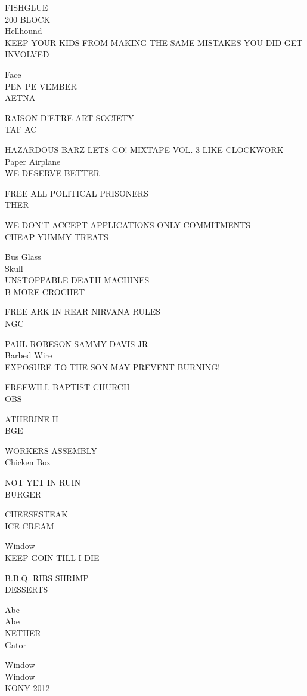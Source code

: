 \documentclass[10pt,letterpaper]{article}
\begin{document}
FISHGLUE\\
200 BLOCK\\
Hellhound\\
KEEP YOUR KIDS FROM MAKING THE SAME MISTAKES YOU DID GET INVOLVED

Face\\
PEN PE VEMBER\\
AETNA

RAISON D'ETRE ART SOCIETY\\
TAF AC

HAZARDOUS BARZ LETS GO! MIXTAPE VOL. 3 LIKE CLOCKWORK\\
Paper Airplane\\
WE DESERVE BETTER

FREE ALL POLITICAL PRISONERS\\
THER

WE DON'T ACCEPT APPLICATIONS ONLY COMMITMENTS\\
CHEAP YUMMY TREATS

Bus Glass\\
Skull\\
UNSTOPPABLE DEATH MACHINES\\
B{-}MORE CROCHET

FREE ARK IN REAR NIRVANA RULES\\
NGC

PAUL ROBESON SAMMY DAVIS JR\\
Barbed Wire\\
EXPOSURE TO THE SON MAY PREVENT BURNING!

FREEWILL BAPTIST CHURCH\\
OBS

ATHERINE H\\
BGE

WORKERS ASSEMBLY\\
Chicken Box

NOT YET IN RUIN\\
BURGER

CHEESESTEAK\\
ICE CREAM

Window\\
KEEP GOIN TILL I DIE

B.B.Q. RIBS SHRIMP\\
DESSERTS

Abe\\
Abe\\
NETHER\\
Gator

Window\\
Window\\
KONY 2012
\end{document}
